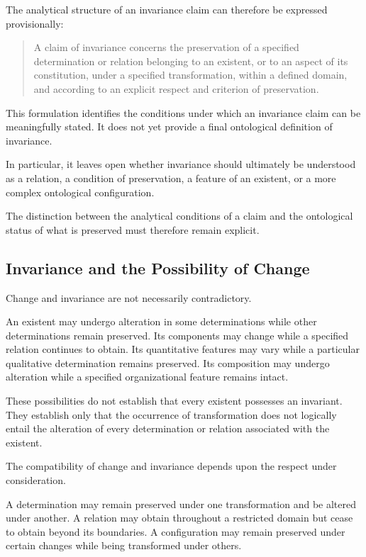 The analytical structure of an invariance claim can
therefore be expressed provisionally:

\begin{quote}
A claim of invariance concerns the preservation of a
specified determination or relation belonging to an
existent, or to an aspect of its constitution, under
a specified transformation, within a defined domain,
and according to an explicit respect and criterion
of preservation.
\end{quote}

This formulation identifies the conditions under which
an invariance claim can be meaningfully stated. It does
not yet provide a final ontological definition of invariance.

In particular, it leaves open whether invariance should
ultimately be understood as a relation, a condition of
preservation, a feature of an existent, or a more complex
ontological configuration.

The distinction between the analytical conditions of
a claim and the ontological status of what is preserved
must therefore remain explicit.

\subsection{Invariance and the Possibility of Change}

Change and invariance are not necessarily contradictory.

An existent may undergo alteration in some determinations
while other determinations remain preserved. Its components
may change while a specified relation continues to obtain.
Its quantitative features may vary while a particular
qualitative determination remains preserved. Its
composition may undergo alteration while a specified
organizational feature remains intact.

These possibilities do not establish that every existent
possesses an invariant. They establish only that the
occurrence of transformation does not logically entail
the alteration of every determination or relation
associated with the existent.

The compatibility of change and invariance depends upon
the respect under consideration.

A determination may remain preserved under one transformation
and be altered under another. A relation may obtain
throughout a restricted domain but cease to obtain beyond
its boundaries. A configuration may remain preserved
under certain changes while being transformed under
others.

